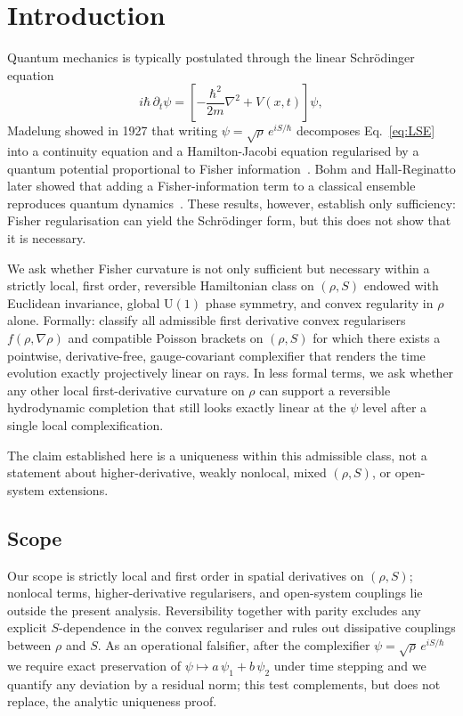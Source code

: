 \documentclass[11pt,a4paper]{article}
\numberwithin{equation}{section}
\theoremstyle{thmcompact}
\theoremstyle{remark}
\begin{document}
\section{Introduction}
Quantum mechanics is typically postulated through the linear Schrödinger equation
\begin{equation}
	i\hbar\,\partial_t\psi=\left[-\frac{\hbar^2}{2m}\nabla^2+V(x,t)\right]\psi,
	\label{eq:LSE}
\end{equation}
Madelung showed in 1927 that writing $\psi=\sqrt{\rho}\,e^{iS/\hbar}$ decomposes Eq.~\eqref{eq:LSE} into a continuity equation and a Hamilton-Jacobi equation regularised by a quantum potential proportional to Fisher information~\cite{madelung1927}. Bohm and Hall-Reginatto later showed that adding a Fisher-information term to a classical ensemble reproduces quantum dynamics~\cite{bohm1952,hall2002}. These results, however, establish only sufficiency: Fisher regularisation can yield the Schrödinger form, but this does not show that it is necessary.

We ask whether Fisher curvature is not only sufficient but necessary within a strictly local, first order, reversible Hamiltonian class on $(\rho,S)$ endowed with Euclidean invariance, global $\mathrm{U}(1)$
 phase symmetry, and convex regularity in $\rho$ alone. Formally: classify all admissible first derivative convex regularisers $f(\rho,\nabla\rho)$ and compatible Poisson brackets on $(\rho,S)$ for which there exists a pointwise, derivative-free, gauge-covariant complexifier that renders the time evolution exactly projectively linear on rays. In less formal terms, we ask whether any other local first-derivative curvature on $\rho$ can support a reversible hydrodynamic completion that still looks exactly linear at the $\psi$ level after a single local complexification.
  
 The claim established here is a uniqueness within this admissible class, not a statement about higher-derivative, weakly nonlocal, mixed $(\rho,S)$, or open-system extensions.
 
\subsection{Scope} 
Our scope is strictly local and first order in spatial derivatives on $(\rho,S)$; nonlocal terms, higher-derivative regularisers, and open-system couplings lie outside the present analysis. Reversibility together with parity excludes any explicit $S$-dependence in the convex regulariser and rules out dissipative couplings between $\rho$ and $S$. As an operational falsifier, after the complexifier $\psi=\sqrt{\rho}\,e^{iS/\hbar}$ we require exact preservation of $\psi \mapsto a\,\psi_{1}+b\,\psi_{2}$ under time stepping and we quantify any deviation by a residual norm; this test complements, but does not replace, the analytic uniqueness proof.
\end{document}
